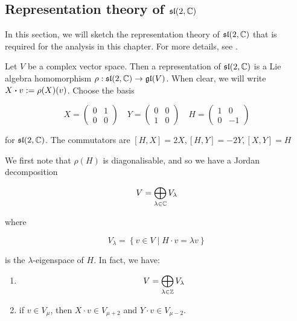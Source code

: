 \documentclass{report}
\renewcommand{\sl}{\mathfrak{sl}}
\begin{document}
\begin{subappendices}

    \section{Representation theory of \(\sl(2, \C)\)}

    \label{sec:representation-theory-sl2}
    
    In this section, we will sketch the representation theory of \(\sl(2, \C)\) that is required for the analysis in this chapter. For more details, see \cite[Section 7]{humphreys}.
    
    Let \(V\) be a complex vector space. Then a representation of \(\sl(2, \C)\) is a Lie algebra homomorphism \(\rho : \sl(2, \C) \to \gl(V)\). When clear, we will write \(X \vdot v := \rho(X)(v)\). Choose the basis
    
    \[X = \begin{pmatrix}
        0 & 1 \\
        0 & 0
    \end{pmatrix} \quad Y = \begin{pmatrix}
        0 & 0 \\
        1 & 0
    \end{pmatrix} \quad H = \begin{pmatrix}
        1 & 0 \\
        0 & -1
    \end{pmatrix}\]
    
    for \(\sl(2, \C)\). The commutators are \([H, X] = 2X, [H, Y] = -2Y, [X,Y] = H\)
    
    We first note that \(\rho(H)\) is diagonalisable, and so we have a Jordan decomposition
    
    \[V = \bigoplus_{\lambda \in \mathbb{C}}V_\lambda\]
    
    where
    
    \[V_\lambda = \left\{v \in V \mid H \cdot v = \lambda v\right\}\]
    
    is the \(\lambda\)-eigenspace of \(H\). In fact, we have:
    
    \begin{enumerate}
        \item \[V = \bigoplus_{\lambda \in \mathbb{Z}}V_\lambda\]
        \item if \(v \in V_\mu\), then \(X \cdot v \in V_{\mu+2}\) and \(Y \cdot v \in V_{\mu-2}\).
    \end{enumerate}
    

\end{subappendices}
\end{document}
